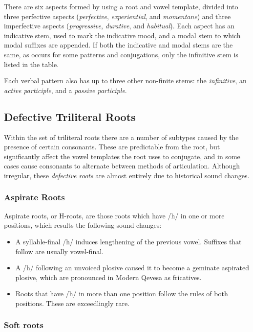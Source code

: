 \documentclass[grammar]{subfiles}
\begin{document}
There are six aspects formed by using a root and vowel template, divided into
three perfective aspects (\emph{perfective}, \emph{experiential}, and
\emph{momentane}) and three imperfective aspects (\emph{progressive},
\emph{durative}, and \emph{habitual}).  Each aspect has an indicative stem,
used to mark the indicative mood, and a modal stem to which modal suffixes are
appended.  If both the indicative and modal stems are the same, as occurs for
some patterns and conjugations, only the infinitive stem is listed in the
table. 

Each verbal pattern also has up to three other non-finite stems: the
\emph{infinitive}, an \emph{active participle}, and a \emph{passive participle}.  


\subsection{Defective Triliteral Roots}
\label{ssec:vm_defective_roots}

Within the set of triliteral roots there are a number of subtypes caused by
the presence of certain consonants.  These are predictable from the root, but
significantly affect the vowel templates the root uses to conjugate, and in
some cases cause consonants to alternate between methods of articulation.
Although irregular, these \emph{defective roots} are almost entirely due to
historical sound changes. 


\subsubsection{Aspirate Roots}
\label{sssec:vm_aspirate_roots}

Aspirate roots, or H-roots, are those roots which have /h/ in one or more positions, which
results the following sound changes:

\begin{itemize}
  \item A syllable-final /h/ induces lengthening of the previous vowel.  Suffixes
    that follow are usually vowel-final.
  \item A /h/ following an unvoiced plosive caused it to become a geminate
    aspirated plosive, which are pronounced in Modern Qevesa as fricatives.
  \item Roots that have /h/ in more than one position follow the rules of both
    positions.  These are exceedlingly rare.
\end{itemize}


\subsubsection{Soft roots}
\label{sssec:vm_soft_roots}
\end{document}
